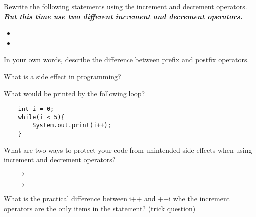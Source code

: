 \documentclass[letterpaper,12pt]{exam}
\begin{document}
\begin{questions}
\begin{samepage}
    \question Rewrite the following statements using the increment and decrement operators. \textbf{\emph{But this time use two different increment and decrement operators.}}
      \begin{itemize}
        \item {}
        \vspace{5mm}
        \item {}
        \vspace{5mm}
       \end{itemize}
\end{samepage}

\begin{samepage}
    \question In your own words, describe the difference between prefix and postfix operators.
    \vspace{25mm}
\end{samepage}

\begin{samepage}
    \question What is a side effect in programming?
    \vspace{5mm}
\end{samepage}

\begin{samepage}
    \question What would be printed by the following loop?
    \begin{verbatim}
    int i = 0;
    while(i < 5){
        System.out.print(i++);
    }
    \end{verbatim}
    \vspace{5mm}
\end{samepage}

\begin{samepage}
    \question What are two ways to protect your code from unintended side effects when using increment and decrement operators?
      \begin{itemize}
        \item [$\rightarrow$]
        \vspace{5mm}
        \item [$\rightarrow$]
        \vspace{5mm}
           \end{itemize}
\end{samepage}

\begin{samepage}
    \question What is the practical difference between i++ and ++i whe the increment operators are the only items in the statement?  (trick question)
    \vspace{5mm}
\end{samepage}


\end{questions}
\end{document}
